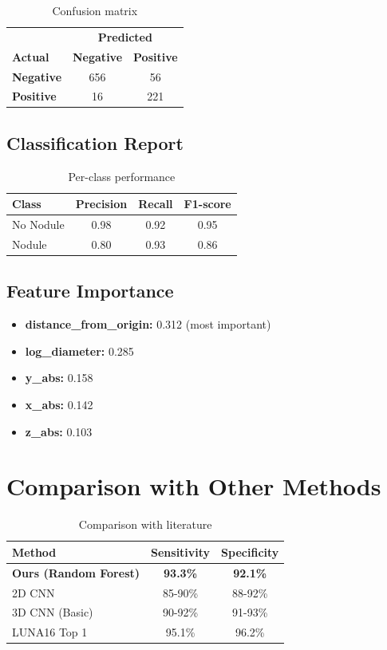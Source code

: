 \documentclass{article}
\begin{document}
\begin{table}[H]
\centering
\begin{tabular}{@{}lcc@{}}
\toprule
 & \multicolumn{2}{c}{\textbf{Predicted}} \\
\textbf{Actual} & \textbf{Negative} & \textbf{Positive} \\
\midrule
\textbf{Negative} & 656 & 56 \\
\textbf{Positive} & 16 & 221 \\
\bottomrule
\end{tabular}
\caption{Confusion matrix}
\label{tab:confusion}
\end{table}

\subsection{Classification Report}
\begin{table}[H]
\centering
\begin{tabular}{@{}lccc@{}}
\toprule
\textbf{Class} & \textbf{Precision} & \textbf{Recall} & \textbf{F1-score} \\
\midrule
No Nodule & 0.98 & 0.92 & 0.95 \\
Nodule & 0.80 & 0.93 & 0.86 \\
\bottomrule
\end{tabular}
\caption{Per-class performance}
\label{tab:classification}
\end{table}

\subsection{Feature Importance}
\begin{itemize}
    \item \textbf{distance\_from\_origin:} 0.312 (most important)
    \item \textbf{log\_diameter:} 0.285
    \item \textbf{y\_abs:} 0.158
    \item \textbf{x\_abs:} 0.142
    \item \textbf{z\_abs:} 0.103
\end{itemize}

\section{Comparison with Other Methods}
\begin{table}[H]
\centering
\begin{tabular}{@{}lcc@{}}
\toprule
\textbf{Method} & \textbf{Sensitivity} & \textbf{Specificity} \\
\midrule
\textbf{Ours (Random Forest)} & \textbf{93.3\%} & \textbf{92.1\%} \\
2D CNN & 85-90\% & 88-92\% \\
3D CNN (Basic) & 90-92\% & 91-93\% \\
LUNA16 Top 1 & 95.1\% & 96.2\% \\
\bottomrule
\end{tabular}
\caption{Comparison with literature}
\label{tab:comparison}
\end{table}
\end{document}
